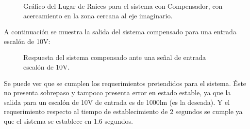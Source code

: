 \documentclass[a4paper,11pt]{article}
\begin{document}
	  \begin{figure}[H] %
	\caption{Gráfico del Lugar de Raices para el sistema con Compensador, con acercamiento en la zona cercana al eje imaginario.}
	\label{fig:LR_comp_2}
	\end{figure} 

A continuación se muestra la salida del sistema compensado para una entrada escalón de 10V:	
	
	  \begin{figure}[H] %
	\caption{Respuesta del sistema compensado ante una señal de entrada escalón de 10V.}
	\label{fig:resp_esc_comp_1}
	\end{figure} 

Se puede ver que se cumplen los requerimientos pretendidos para el sistema. Éste no presenta sobrepaso y tampoco presenta error en estado estable, ya que la salida para un escalón de 10V de entrada es de 1000lm (es la deseada). Y el requerimiento respecto al tiempo de establecimiento de 2 segundos se cumple ya que el sistema se establece en 1.6 segundos.
\end{document}
